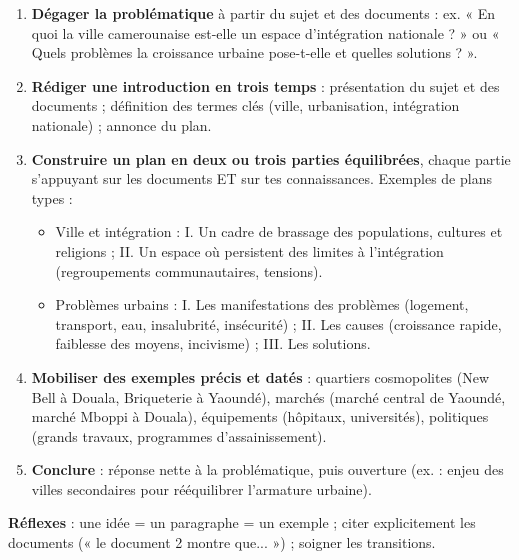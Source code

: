 \documentclass[11pt]{article}
\newcommand{\cle}[1]{{\popxbold\color{popdark}#1}}
\begin{document}
\begin{methode}
\begin{enumerate}
\item \textbf{Dégager la problématique} à partir du sujet et des documents : ex. « En quoi la ville camerounaise est-elle un espace d'intégration nationale ? » ou « Quels problèmes la croissance urbaine pose-t-elle et quelles solutions ? ».
\item \textbf{Rédiger une introduction en trois temps} : présentation du sujet et des documents ; définition des termes clés (\cle{ville}, \cle{urbanisation}, \cle{intégration nationale}) ; annonce du plan.
\item \textbf{Construire un plan en deux ou trois parties équilibrées}, chaque partie s'appuyant sur les documents ET sur tes connaissances. Exemples de plans types :
\begin{itemize}
\item Ville et intégration : I. Un cadre de brassage des populations, cultures et religions ; II. Un espace où persistent des limites à l'intégration (regroupements communautaires, tensions).
\item Problèmes urbains : I. Les manifestations des problèmes (logement, transport, eau, insalubrité, insécurité) ; II. Les causes (croissance rapide, faiblesse des moyens, incivisme) ; III. Les solutions.
\end{itemize}
\item \textbf{Mobiliser des exemples précis et datés} : quartiers cosmopolites (New Bell à Douala, Briqueterie à Yaoundé), marchés (marché central de Yaoundé, marché Mboppi à Douala), équipements (hôpitaux, universités), politiques (grands travaux, programmes d'assainissement).
\item \textbf{Conclure} : réponse nette à la problématique, puis ouverture (ex. : enjeu des villes secondaires pour rééquilibrer l'armature urbaine).
\end{enumerate}
\textbf{Réflexes} : une idée = un paragraphe = un exemple ; citer explicitement les documents (« le document 2 montre que... ») ; soigner les transitions.
\end{methode}
\end{document}
